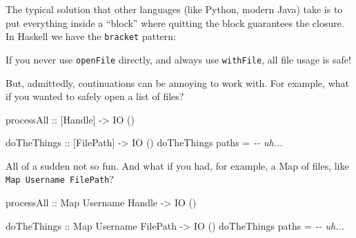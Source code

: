 \documentclass[]{article}
\newenvironment{Shaded}{}{}
\newcommand{\CommentTok}[1]{\textcolor[rgb]{0.38,0.63,0.69}{\textit{#1}}}
\newcommand{\DataTypeTok}[1]{\textcolor[rgb]{0.56,0.13,0.00}{#1}}
\newcommand{\KeywordTok}[1]{\textcolor[rgb]{0.00,0.44,0.13}{\textbf{#1}}}
\newcommand{\NormalTok}[1]{#1}
\newcommand{\OperatorTok}[1]{\textcolor[rgb]{0.40,0.40,0.40}{#1}}
\newcommand{\OtherTok}[1]{\textcolor[rgb]{0.00,0.44,0.13}{#1}}
\begin{document}
The typical solution that other languages (like Python, modern Java) take is to
put everything inside a ``block'' where quitting the block guarantees the
closure. In Haskell we have the \texttt{bracket} pattern:

\begin{Shaded}
\end{Shaded}

If you never use \texttt{openFile} directly, and always use \texttt{withFile},
all file usage is safe!

But, admittedly, continuations can be annoying to work with. For example, what
if you wanted to safely open a list of files?

\begin{Shaded}
\begin{Highlighting}[]
\OtherTok{processAll ::}\NormalTok{ [}\DataTypeTok{Handle}\NormalTok{] }\OtherTok{{-}\textgreater{}} \DataTypeTok{IO}\NormalTok{ ()}

\OtherTok{doTheThings ::}\NormalTok{ [}\DataTypeTok{FilePath}\NormalTok{] }\OtherTok{{-}\textgreater{}} \DataTypeTok{IO}\NormalTok{ ()}
\NormalTok{doTheThings paths }\OtherTok{=} \CommentTok{{-}{-} uh...}
\end{Highlighting}
\end{Shaded}

All of a sudden not so fun. And what if you had, for example, a Map of files,
like \texttt{Map\ Username\ FilePath}?

\begin{Shaded}
\begin{Highlighting}[]
\OtherTok{processAll ::} \DataTypeTok{Map} \DataTypeTok{Username} \DataTypeTok{Handle} \OtherTok{{-}\textgreater{}} \DataTypeTok{IO}\NormalTok{ ()}

\OtherTok{doTheThings ::} \DataTypeTok{Map} \DataTypeTok{Username} \DataTypeTok{FilePath} \OtherTok{{-}\textgreater{}} \DataTypeTok{IO}\NormalTok{ ()}
\NormalTok{doTheThings paths }\OtherTok{=} \CommentTok{{-}{-} uh...}
\end{Highlighting}
\end{Shaded}
\end{document}
